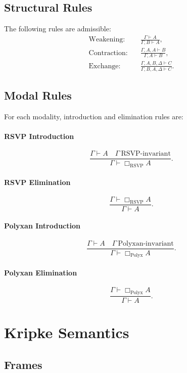 \subsection{Structural Rules}

The following rules are admissible:
\begin{align*}
\text{Weakening:} &\quad 
\frac{\Gamma \vdash A}{\Gamma, B \vdash A}, \\
\text{Contraction:} &\quad
\frac{\Gamma, A, A \vdash B}{\Gamma, A \vdash B}, \\
\text{Exchange:} &\quad
\frac{\Gamma, A, B, \Delta \vdash C}{\Gamma, B, A, \Delta \vdash C}.
\end{align*}

\subsection{Modal Rules}

For each modality, introduction and elimination rules are:

\paragraph{RSVP Introduction}
\[
\frac{\Gamma \vdash A \quad \Gamma\ \text{RSVP-invariant}}
{\Gamma \vdash \Box_{\mathrm{RSVP}}A}.
\]

\paragraph{RSVP Elimination}
\[
\frac{\Gamma \vdash \Box_{\mathrm{RSVP}}A}
{\Gamma \vdash A}.
\]

\paragraph{Polyxan Introduction}
\[
\frac{\Gamma \vdash A \quad \Gamma\ \text{Polyxan-invariant}}
{\Gamma \vdash \Box_{\mathrm{Polyx}}A}.
\]

\paragraph{Polyxan Elimination}
\[
\frac{\Gamma \vdash \Box_{\mathrm{Polyx}}A}
{\Gamma \vdash A}.
\]

\section{Kripke Semantics}

\subsection{Frames}

